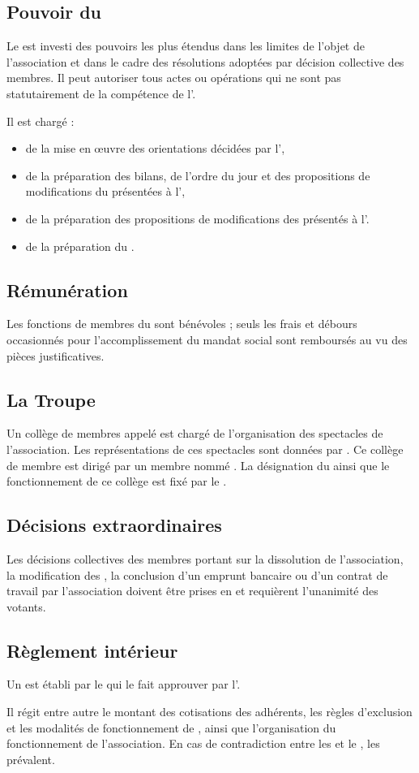 \documentclass[a4paper,french,10pt]{article}
\newcommand{\article}[1]{\subsection{#1}\addtocounter{article}{1}}
\newcounter{article}
\begin{document}
\article{Pouvoir du \bureau{}}
\label{sec:pouvoirs}
Le \bureau{} est investi des pouvoirs les plus étendus dans les limites
de l’objet de l’association et dans le cadre des résolutions adoptées
par décision collective des membres. Il peut autoriser tous actes ou
opérations qui ne sont pas statutairement de la compétence de
l’\AG{}.

Il est chargé :
\begin{itemize}
\item de la mise en \oe{}uvre des orientations décidées par l'\AG{},

  \item de la préparation des bilans, de l'ordre du jour et des
  propositions de modifications du \RI{} présentées à
  l'\AG{},

  \item de la préparation des propositions de modifications des \statuts{}
  présentés à l'\AGE{}.

  \item de la préparation du \RI{}.

  
\end{itemize}



\article{Rémunération}
\label{sec:remuneration}
Les fonctions de membres du \bureau{} sont bénévoles ; seuls les frais et
débours occasionnés pour l’accomplissement du mandat social sont
remboursés au vu des pièces justificatives.

\article{La Troupe}
\label{sec:troupe}
Un collège de membres appelé \textit{\troupe{}} est chargé de
l'organisation des spectacles de l'association. Les représentations de
ces spectacles sont données par \troupe{}. Ce collège de membre est
dirigé par un membre nommé \DA{}. La désignation du \DA{} ainsi que le
fonctionnement de ce collège est fixé par le \RI{}.

\article{Décisions extraordinaires}
\label{sec:decisions-extra}
Les décisions collectives des membres portant sur la dissolution de
l’association, la modification des \statuts{}, la conclusion d’un emprunt
bancaire ou d’un contrat de travail par l’association doivent être prises en \AG{} et requièrent l’unanimité des votants.

\article{Règlement intérieur}
\label{sec:reglement}
Un \RI{} est établi par le \bureau{} qui le fait approuver
par l’\AG{}.

Il régit entre autre le montant des cotisations des adhérents, les règles d'exclusion et les modalités de fonctionnement de \troupe{}, ainsi que l'organisation du fonctionnement de l'association. En cas de contradiction entre les \statuts{} et le \RI{}, les \statuts{} prévalent.
\end{document}
